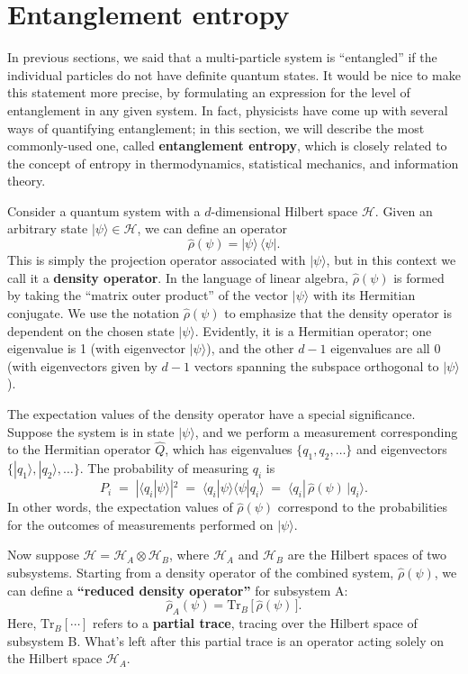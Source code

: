 \documentclass[pra,12pt]{revtex4}
\begin{document}
\section{Entanglement entropy}
\label{sec:entropy}

In previous sections, we said that a multi-particle system is
``entangled'' if the individual particles do not have definite quantum
states.  It would be nice to make this statement more precise, by
formulating an expression for the level of entanglement in any given
system.  In fact, physicists have come up with several ways of
quantifying entanglement; in this section, we will describe the most
commonly-used one, called \textbf{entanglement entropy}, which is
closely related to the concept of entropy in thermodynamics,
statistical mechanics, and information theory.

Consider a quantum system with a $d$-dimensional Hilbert space
$\mathscr{H}$.  Given an arbitrary state $|\psi\rangle \in
\mathscr{H}$, we can define an operator
$$\hat{\rho}(\psi) = |\psi\rangle\, \langle\psi|.$$
This is simply the projection operator associated with $|\psi\rangle$,
but in this context we call it a \textbf{density operator}.  In the
language of linear algebra, $\hat{\rho}(\psi)$ is formed by taking the
``matrix outer product'' of the vector $|\psi\rangle$ with its
Hermitian conjugate.  We use the notation $\hat{\rho}(\psi)$ to
emphasize that the density operator is dependent on the chosen state
$|\psi\rangle$.  Evidently, it is a Hermitian operator; one eigenvalue
is 1 (with eigenvector $|\psi\rangle$), and the other $d-1$
eigenvalues are all $0$ (with eigenvectors given by $d-1$ vectors
spanning the subspace orthogonal to $|\psi\rangle$).

The expectation values of the density operator have a special
significance.  Suppose the system is in state $|\psi\rangle$, and we
perform a measurement corresponding to the Hermitian operator
$\hat{Q}$, which has eigenvalues $\{q_1,q_2,\dots\}$ and eigenvectors
$\{|q_1\rangle,|q_2\rangle,\dots\}$.  The probability of measuring
$q_i$ is
$$P_i \;=\; |\langle q_i| \psi\rangle|^2 \;=\; \langle q_i |\psi\rangle \langle \psi|q_i\rangle \;=\; \langle q_i |\, \hat{\rho}(\psi)\, |q_i \rangle.$$
In other words, the expectation values of $\hat{\rho}(\psi)$
correspond to the probabilities for the outcomes of measurements
performed on $|\psi\rangle$.

Now suppose $\mathscr{H} = \mathscr{H}_A \otimes \mathscr{H}_B$, where
$\mathscr{H}_A$ and $\mathscr{H}_B$ are the Hilbert spaces of two
subsystems.  Starting from a density operator of the combined system,
$\hat{\rho}(\psi)$, we can define a \textbf{``reduced density
  operator''} for subsystem A:
$$\hat{\rho}_A(\psi) = \mathrm{Tr}_B \,\big[\,\hat{\rho}(\psi)\,\big].$$
Here, $\mathrm{Tr}_B[\cdots]$ refers to a \textbf{partial trace},
tracing over the Hilbert space of subsystem B.  What's left after
this partial trace is an operator acting solely on the Hilbert space
$\mathscr{H}_A$.
\end{document}
